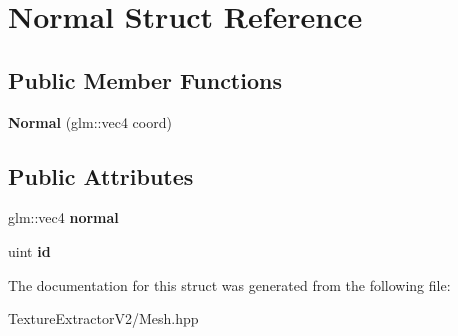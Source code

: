 \hypertarget{struct_normal}{}\section{Normal Struct Reference}
\label{struct_normal}
\subsection*{Public Member Functions}
\begin{DoxyCompactItemize}
\item 
\hypertarget{struct_normal_a19c72c824df84768e56cd6c610bf8edd}{}{\bfseries Normal} (glm\+::vec4 coord)\label{struct_normal_a19c72c824df84768e56cd6c610bf8edd}

\end{DoxyCompactItemize}
\subsection*{Public Attributes}
\begin{DoxyCompactItemize}
\item 
\hypertarget{struct_normal_a555de7ec7d67e743968b5f69af17dd1c}{}glm\+::vec4 {\bfseries normal}\label{struct_normal_a555de7ec7d67e743968b5f69af17dd1c}

\item 
\hypertarget{struct_normal_a39256c233377305342349bd73991d3e3}{}uint {\bfseries id}\label{struct_normal_a39256c233377305342349bd73991d3e3}

\end{DoxyCompactItemize}


The documentation for this struct was generated from the following file\+:\begin{DoxyCompactItemize}
\item 
Texture\+Extractor\+V2/Mesh.\+hpp\end{DoxyCompactItemize}
